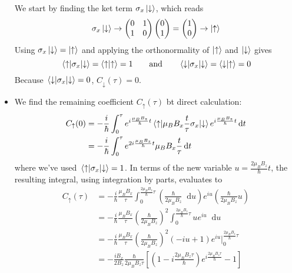 \documentclass[11pt, a4paper]{article}
\newcommand{\diff}{\mathop{}\!\mathrm{d}} %
\newcommand{\eqtext}[1]{\qquad \text{#1} \qquad}
\newcommand{\ua}{\uparrow}  %
\newcommand{\da}{\downarrow}  %
\begin{document}
\begin{itemize}
	We start by finding the ket term $ \sigma_{x}\ket{\da} $, which reads
	\begin{equation*}
		\sigma_{x}\ket{\da} \to 
		\begin{pmatrix}
		0 & 1\\
		1 & 0
		\end{pmatrix}
		\begin{pmatrix}
		0\\
		1
		\end{pmatrix}
		= 
		\begin{pmatrix}
		1\\
		0
		\end{pmatrix}
		\to \ket{\ua}
	\end{equation*}
	Using  $ \sigma_{x}\ket{\da} = \ket{\ua} $ and applying the orthonormality of $ \ket{\ua} $ and $ \ket{\da} $ gives
	\begin{equation*}
		\mel{\ua}{\sigma_{x}}{\da} = \braket{\ua}{\ua} = 1 \eqtext{and} \mel{\da}{\sigma_{x}}{\da} = \braket{\da}{\ua} = 0
	\end{equation*}
	Because $ \mel{\da}{\sigma_{x}}{\da} = 0 $, $ C_{\da}(\tau) = 0 $. 
	
	\item We find the remaining coefficient $ C_{\ua}(\tau) $ bt direct calculation:
	\begin{align*}
		C_{\ua}(0) &= - \frac{i}{\hbar}\int_{0}^{\tau} e^{i\frac{\mu_{B}B_{z}}{\hbar}t}\mel{\ua}{\mu_{B}B_{x}\frac{t}{\tau}\sigma_{x}}{\da} e^{i\frac{\mu_{B}B_{z}}{\hbar}t} \diff t\\
		& = - \frac{i}{\hbar}\int_{0}^{\tau} e^{2i\frac{\mu_{B}B_{z}}{\hbar}t} \mu_{B}B_{x}\frac{t}{\tau} \diff t
	\end{align*}
	where we've used $ \mel{\ua}{\sigma_{x}}{\da} = 1$. In terms of the new variable $ u = \frac{2\mu_{B}B_{z}}{\hbar}t $, the resulting integral, using integration by parts, evaluates to
	\begin{align*}
		C_{\ua}(\tau) &= - \frac{i}{\hbar}\frac{\mu_{B}B_{x}}{\tau} \int_{0}^{ \frac{2\mu_{B}B_{z}}{\hbar}\tau} \left(\frac{\hbar}{2\mu_{B}B_{z}}\diff u\right) e^{iu} \left(\frac{\hbar}{2\mu_{B}B_{z}}u\right) \\
		& = - \frac{i}{\hbar}\frac{\mu_{B}B_{x}}{\tau} \left(\frac{\hbar}{2\mu_{B}B_{z}}\right)^{2} \int_{0}^{ \frac{2\mu_{B}B_{z}}{\hbar}\tau} ue^{iu}\diff u\\
		& = - \frac{i}{\hbar}\frac{\mu_{B}B_{x}}{\tau} \left(\frac{\hbar}{2\mu_{B}B_{z}}\right)^{2}  \left(-iu + 1\right)e^{iu}\Big |_{0}^{\frac{2\mu_{B}B_{z}}{\hbar}\tau}\\
		& = -\frac{iB_{x}}{2B_{z}} \frac{\hbar}{2\mu_{B}B_{z}\tau} \left[\left(1 - i \frac{2\mu_{B}B_{z}\tau}{\hbar}\right)e^{i\frac{2\mu_{B}B_{z}\tau}{\hbar}} - 1\right]
	\end{align*}
	

\end{itemize}
\end{document}
